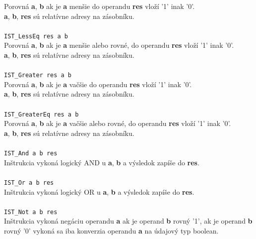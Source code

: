 \documentclass[12pt,a4paper,titlepage,final]{article}
\begin{document}
Porovná \textbf{a}, \textbf{b} ak je \textbf{a} menšie do operandu \textbf{res} vloží '1' inak '0'.\\
\textbf{a}, \textbf{b}, \textbf{res} sú relatívne adresy na zásobníku.\\
\\\texttt{IST\_LessEq res a b}\\
Porovná \textbf{a}, \textbf{b} ak je \textbf{a} menšie alebo rovné, do operandu \textbf{res} vloží '1' inak '0'.\\
\textbf{a}, \textbf{b}, \textbf{res} sú relatívne adresy na zásobníku.\\
\\\texttt{IST\_Greater res a b}\\
Porovná \textbf{a}, \textbf{b} ak je \textbf{a} vačšie do operandu \textbf{res} vloží '1' inak '0'.\\
\textbf{a}, \textbf{b}, \textbf{res} sú relatívne adresy na zásobníku.\\
\\\texttt{IST\_GreaterEq res a b}\\
Porovná \textbf{a}, \textbf{b} ak je \textbf{a} vačšie alebo rovné, do operandu \textbf{res} vloží '1' inak '0'.\\
\textbf{a}, \textbf{b}, \textbf{res} sú relatívne adresy na zásobníku.\\
\\\texttt{IST\_And a b res}\\
Inštrukcia vykoná logický AND u \textbf{a}, \textbf{b} a výsledok zapíše do \textbf{res}.\\
\\\texttt{IST\_Or a b res}\\
Inštrukcia vykoná logický OR u \textbf{a}, \textbf{b} a výsledok zapíše do \textbf{res}.\\
\\\texttt{IST\_Not a b res}\\
Inštrukcia vykoná negáciu operandu \textbf{a} ak je operand \textbf{b} rovný '1', ak je operand \textbf{b} rovný '0'
vykoná sa iba konverzia operandu \textbf{a} na údajový typ boolean.\\
\end{document}
